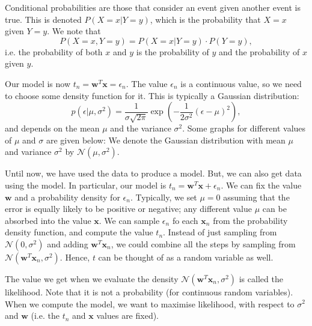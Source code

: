 \documentclass[a4paper, openany]{memoir}
\begin{document}
    Conditional probabilities are those that consider an event given another event is true. This is denoted $P(X = x | Y = y)$, which is the probability that $X = x$ given $Y = y$. We note that
    \[P(X = x, Y = y) = P(X = x | Y = y) \cdot P(Y = y),\]
    i.e. the probability of both $x$ and $y$ is the probability of $y$ and the probability of $x$ given $y$.

    Our model is now $t_n = \mathbf{w}^T \mathbf{x} = \epsilon_n$. The value $\epsilon_n$ is a continuous value, so we need to choose some density function for it. This is typically a Gaussian distribution:
    \[p(\epsilon | \mu, \sigma^2) = \frac{1}{\sigma \sqrt{2\pi}} \exp \left(-\frac{1}{2\sigma^2} (\epsilon - \mu)^2\right),\]
    and depends on the mean $\mu$ and the variance $\sigma^2$. Some graphs for different values of $\mu$ and $\sigma$ are given below:
    We denote the Gaussian distribution with mean $\mu$ and variance $\sigma^2$ by $\mathcal{N}(\mu, \sigma^2)$.

    Until now, we have used the data to produce a model. But, we can also get data using the model. In particular, our model is $t_n = \mathbf{w}^T \mathbf{x} + \epsilon_n$. We can fix the value $\mathbf{w}$ and a probability density for $\epsilon_n$. Typically, we set $\mu = 0$ assuming that the error is equally likely to be positive or negative; any different value $\mu$ can be absorbed into the value $\mathbf{x}$. We can sample $\epsilon_n$ fo each $\mathbf{x}_n$ from the probability density function, and compute the value $t_n$. Instead of just sampling from $\mathcal{N}(0, \sigma^2)$ and adding $\mathbf{w}^T \mathbf{x}_n$, we could combine all the steps by sampling from $\mathcal{N}(\mathbf{w}^T \mathbf{x}_n, \sigma^2)$. Hence, $t$ can be thought of as a random variable as well. 
    
    The value we get when we evaluate the density $\mathcal{N}(\mathbf{w}^T \mathbf{x}_n, \sigma^2)$ is called the likelihood. Note that it is not a probability (for continuous random variables). When we compute the model, we want to maximise likelihood, with respect to $\sigma^2$ and $\mathbf{w}$ (i.e. the $t_n$ and $\mathbf{x}$ values are fixed).
\end{document}
